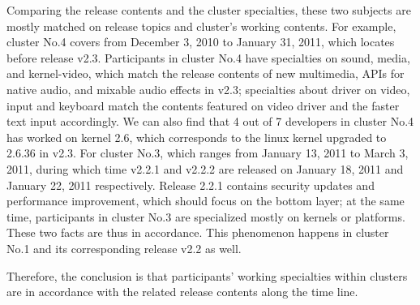 \documentclass[10pt, conference, compsocconf]{IEEEtran}
\begin{document}
Comparing the release contents and the cluster specialties, these two subjects are mostly matched on release topics and cluster's working contents. For example, cluster No.4 covers from December 3, 2010 to January 31, 2011, which locates before release v2.3. Participants in cluster No.4 have specialties on sound, media, and kernel-video, which match the release contents of new multimedia, APIs for native audio, and mixable audio effects in v2.3; specialties about driver on video, input and keyboard match the contents featured on video driver and the faster text input accordingly. We can also find that 4 out of 7 developers in cluster No.4 has worked on kernel 2.6, which corresponds to the linux kernel upgraded to 2.6.36 in v2.3.
For cluster No.3, which ranges from January 13, 2011 to March 3, 2011, during which time v2.2.1 and v2.2.2 are released on January 18, 2011 and January 22, 2011 respectively. Release 2.2.1 contains security updates and performance improvement, which should focus on the bottom layer; at the same time, participants in cluster No.3 are specialized mostly on kernels or platforms. These two facts are thus in accordance. This phenomenon happens in cluster No.1 and its corresponding release v2.2 as well.

Therefore, the conclusion is that participants' working specialties within clusters are in accordance with the related release contents along the time line.
%
%

\end{document}
